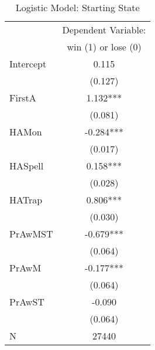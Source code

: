 \begin{table}
\caption{Logistic Model: Starting State}
\begin{center}
\begin{tabular}{lc}
\hline
          & Dependent Variable:   \\
          &  win (1) or lose (0)  \\
\midrule
Intercept & 0.115                 \\
          & (0.127)               \\
FirstA    & 1.132***              \\
          & (0.081)               \\
HAMon     & -0.284***             \\
          & (0.017)               \\
HASpell   & 0.158***              \\
          & (0.028)               \\
HATrap    & 0.806***              \\
          & (0.030)               \\
PrAwMST   & -0.679***             \\
          & (0.064)               \\
PrAwM     & -0.177***             \\
          & (0.064)               \\
PrAwST    & -0.090                \\
          & (0.064)               \\
N         & 27440                 \\
\hline
\end{tabular}
\end{center}
\end{table}